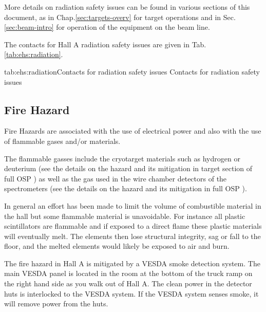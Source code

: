  More details on radiation safety issues can be found in various sections of this 
 document, as in Chap.\ref{sec:targets-overv} for target operations and
 in Sec.\ref{sec:beam-intro} for operation of the equipment on the beam line.
 
 The contacts for Hall A radiation safety issues are given in Tab.\ref{tab:ehs:radiation}.
 
 \begin{namestab}{tab:ehs:radiation}{Contacts for radiation safety issues}{%
   Contacts for radiation safety issues}
 \end{namestab}


\begin{safetyen}{0}{0}
\section{Fire Hazard} 
\label{sec:firehazard}
\end{safetyen}

 Fire Hazards are associated with the use of electrical power and also with the use of 
 flammable gases and/or materials. 

 The flammable gasses include the cryotarget
 materials such as hydrogen or deuterium 
 (see the details on the hazard and its mitigation in target section of full OSP ) as well as
 the gas used in the wire chamber detectors of the spectrometers 
 (see the details on the hazard and its mitigation in full OSP ).
 
 In general an effort has been made to limit the volume of combustible material 
 in the hall but some flammable material is unavoidable. For instance all plastic 
 scintillators are flammable and if exposed to a direct flame these 
 plastic materials will eventually melt. The elements then lose structural integrity, 
 sag or fall to the floor, and the melted elements would likely be exposed to air and burn.

 
 The fire hazard in Hall A is mitigated by a VESDA smoke detection system. 
 The main VESDA panel is located in the room at the bottom of the truck ramp on the 
 right hand side as you walk out of Hall A. The clean power in the detector huts is 
 interlocked to the VESDA system. If the VESDA system senses smoke, it will remove power 
 from the huts.

